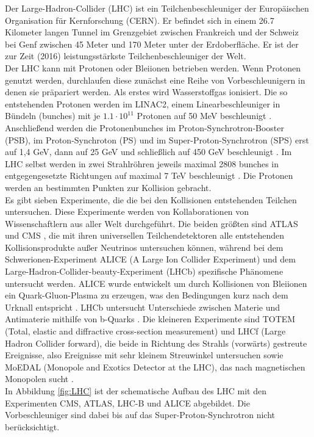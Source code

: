 Der Large-Hadron-Collider (LHC) ist ein Teilchenbeschleuniger der Europ\"aischen Organisation f\"ur Kernforschung (CERN). Er befindet sich in einem \num{26,7} Kilometer langen Tunnel im Grenzgebiet zwischen Frankreich und der Schweiz bei Genf zwischen \num{45} Meter und \num{170} Meter unter der Erdoberfl\"ache. Er ist der zur Zeit (\num{2016}) leistungsst\"arkste Teilchenbeschleuniger der Welt.\\
Der LHC kann mit Protonen oder Bleiionen betrieben werden. Wenn Protonen genutzt werden, durchlaufen diese zun\"achst eine Reihe von Vorbeschleunigern in denen sie pr\"apariert werden. Als erstes wird Wasserstoffgas ionisiert. Die so entstehenden Protonen werden im LINAC2, einem Linearbeschleuniger in B\"undeln (bunches) mit je $\num{1,1}\cdot\num{10}^{\num{11}}$ Protonen auf 50 MeV beschleunigt \cite{O'Luanaigh:1997427}. Anschlie\ss end werden die Protonenbunches im Proton-Synchrotron-Booster (PSB), im Proton-Synchroton (PS) und im Super-Proton-Synchrotron (SPS) erst auf 1,4 GeV, dann auf 25 GeV und schlie\ss lich auf 450 GeV beschleunigt \cite{O'Luanaigh:1997193}. Im LHC selbst werden in zwei Strahlr\"ohren jeweils maximal 2808 bunches in entgegengesetzte Richtungen auf maximal 7 TeV beschleunigt \cite{Lefevre:1165534}. Die Protonen werden an bestimmten Punkten zur Kollision gebracht. \\
Es gibt sieben Experimente, die die bei den Kollisionen entstehenden Teilchen untersuchen. Diese Experimente werden von Kollaborationen von Wissenschaftlern aus aller Welt durchgef\"uhrt. Die beiden gr\"o\ss ten sind ATLAS \cite{ATLAS} und CMS \cite{CMS}, die mit ihren universellen Teilchendetektoren alle entstehenden Kollisionsprodukte au\ss er Neutrinos untersuchen k\"onnen, w\"ahrend bei dem Schwerionen-Experiment ALICE (A Large Ion Collider Experiment) und dem Large-Hadron-Collider-beauty-Experiment (LHCb) spezifische Ph\"anomene untersucht werden. ALICE wurde entwickelt um durch Kollisionen von Bleiionen ein Quark-Gluon-Plasma zu erzeugen, was den Bedingungen kurz nach dem Urknall entspricht \cite{ALICE}. LHCb untersucht Unterschiede zwischen Materie und Antimaterie mithilfe von b-Quarks \cite{LHCb}. Die kleineren Experimente sind TOTEM (Total, elastic and diffractive cross-section measurement) und LHCf (Large Hadron Collider forward), die beide in Richtung des Strahls (\glqq vorw\"arts\grqq) gestreute Ereignisse, also Ereignisse mit sehr kleinem Streuwinkel untersuchen \cite{LHCf,TOTEM} sowie MoEDAL (Monopole and Exotics Detector at the LHC), das nach magnetischen Monopolen sucht \cite{MoEDAL}.\\%
In Abbildung \ref{fig:LHC} ist der schematische Aufbau des LHC mit den Experimenten CMS, ATLAS, LHC-B und ALICE abgebildet. Die Vorbeschleuniger sind dabei bis auf das Super-Proton-Synchrotron nicht ber\"ucksichtigt.

